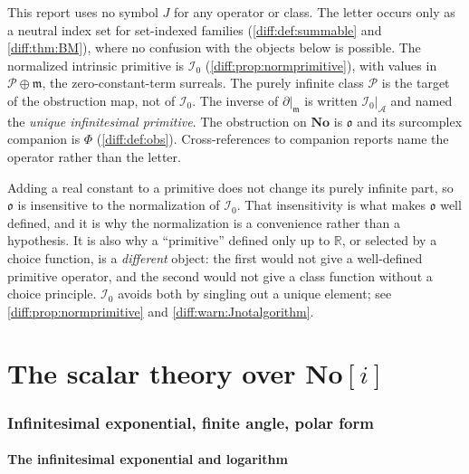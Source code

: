 \documentclass[11pt,letterpaper]{article}
\numberwithin{equation}{section}
\theoremstyle{definition}
\theoremstyle{remark}
\newcommand{\No}{\mathbf{No}}
\newcommand{\SC}{\mathbf{No}[i]}
\newcommand{\R}{\mathbb R}
\newcommand{\der}{\partial}
\newcommand{\mm}{\mathfrak m}
\newcommand{\Pcl}{\mathcal P}
\newcommand{\Acl}{\mathcal A}
\newcommand{\Izero}{\mathcal I_{0}}
\newcommand{\Obs}{\mathfrak o}
\begin{document}
\begin{convention}
\label{diff:conv:noJ}
This report uses no symbol $J$ for any operator or class.  The letter
occurs only as a neutral index set for set-indexed families
(\cref{diff:def:summable} and \cref{diff:thm:BM}), where no confusion with
the objects below is possible.  The normalized intrinsic primitive is
$\Izero$ (\cref{diff:prop:normprimitive}), with values in
$\Pcl\oplus\mm$, the zero-constant-term surreals. The purely infinite
class $\Pcl$ is the target of the obstruction map, not of $\Izero$.
The inverse of $\der|_{\mm}$ is written
$\Izero|_{\Acl}$ and named the \emph{unique infinitesimal primitive}. The
obstruction on $\No$ is $\Obs$ and its surcomplex companion is $\Phi$
(\cref{diff:def:obs}). Cross-references to companion reports name the operator
rather than the letter.
\end{convention}

\begin{remark}
\label{diff:rem:obsnormalization}
Adding a real constant to a primitive does not change its purely infinite
part, so $\Obs$ is insensitive to the normalization of $\Izero$. That
insensitivity is what makes $\Obs$ well defined, and it is why the
normalization is a convenience rather than a hypothesis. It is also why a
``primitive'' defined only up to $\R$, or selected by a choice function, is a
\emph{different} object: the first would not give a well-defined primitive
operator, and the second would not give a class function without a choice
principle. $\Izero$ avoids both by singling out a unique element; see
\cref{diff:prop:normprimitive} and \cref{diff:warn:Jnotalgorithm}.
\end{remark}
\part{The scalar theory over \texorpdfstring{$\SC$}{No[i]}}
\label{diff:part:scalar}

\section{Infinitesimal exponential, finite angle, polar form}
\label{diff:sec:phasegeometry}

\subsection{The infinitesimal exponential and logarithm}
\label{diff:sub:smallexp}
\end{document}
